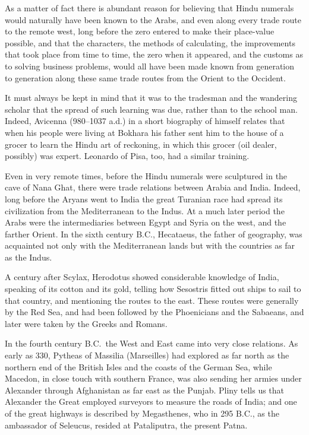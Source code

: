 \documentclass[11pt,a4paper]{article}
\begin{document}
As a matter of fact there is abundant reason for believing that Hindu numerals would naturally have been known to the Arabs, and even along every trade route to the remote west, long before the zero entered to make their place-value possible, and that the characters, the methods of calculating, the improvements that took place from time to time, the zero when it appeared, and the customs as to solving business problems, would all have been made known from generation to generation along these same trade routes from the Orient to the Occident.

It must always be kept in mind that it was to the tradesman and the wandering scholar that the spread of such learning was due, rather than to the school man. Indeed, Avicenna (980--1037 a.d.) in a short biography of himself relates that when his people were living at Bokhara his father sent him to the house of a grocer to learn the Hindu art of reckoning, in which this grocer (oil dealer, possibly) was expert. Leonardo of Pisa, too, had a similar training.

Even in very remote times, before the Hindu numerals were sculptured in the cave of Nana Ghat, there were trade relations between Arabia and India. Indeed, long before the Aryans went to India the great Turanian race had spread its civilization from the Mediterranean to the Indus. At a much later period the Arabs were the intermediaries between Egypt and Syria on the west, and the farther Orient. In the sixth century B.C., Hecataeus, the father of geography, was acquainted not only with the Mediterranean lands but with the countries as far as the Indus.

A century after Scylax, Herodotus showed considerable knowledge of India, speaking of its cotton and its gold, telling how Sesostris fitted out ships to sail to that country, and mentioning the routes to the east. These routes were generally by the Red Sea, and had been followed by the Phoenicians and the Sabaeans, and later were taken by the Greeks and Romans.

In the fourth century B.C.\ the West and East came into very close relations. As early as 330, Pytheas of Massilia (Marseilles) had explored as far north as the northern end of the British Isles and the coasts of the German Sea, while Macedon, in close touch with southern France, was also sending her armies under Alexander through Afghanistan as far east as the Punjab. Pliny tells us that Alexander the Great employed surveyors to measure the roads of India; and one of the great highways is described by Megasthenes, who in 295 B.C., as the ambassador of Seleucus, resided at Pataliputra, the present Patna.
\end{document}
